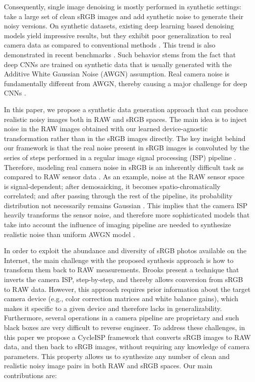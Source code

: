 \documentclass[10pt,twocolumn,letterpaper]{article}
\begin{document}
Consequently, single image denoising is mostly performed in synthetic settings: take a large set of clean sRGB images and add synthetic noise to generate their noisy versions. 
On synthetic datasets, existing deep learning based denoising models yield impressive results, but they exhibit poor generalization to real camera data as compared to conventional methods \cite{NLM,BM3D}. 
This trend is also demonstrated in recent benchmarks \cite{sidd,dnd}. Such behavior stems from the fact that deep CNNs are trained on synthetic data that is usually generated with the Additive White Gaussian Noise (AWGN) assumption. 
Real camera noise is fundamentally different from AWGN, thereby causing a major challenge for deep CNNs \cite{bertalmio2018denoising,foi2009noisemodel,foi2008noisemodel}. 

In this paper, we propose a synthetic data generation approach that can produce realistic noisy images both in RAW and sRGB spaces. 
The main idea is to inject noise in the RAW images obtained with our learned device-agnostic transformation rather than in the sRGB images directly. 
The key insight behind our framework is that the real noise present in sRGB images is convoluted by the series of steps performed in a regular image signal processing (ISP) 
pipeline \cite{bertalmio2018denoising, Ramanath2005}.
Therefore, modeling real camera noise in sRGB is an inherently difficult task as compared to RAW sensor data \cite{lebrun2012secrets}. As an example, noise at the RAW sensor space is signal-dependent; after demosaicking, it becomes spatio-chromatically correlated; and after passing through the rest of the pipeline, its probability distribution not necessarily remains Gaussian \cite{seybold2014noise}. 
This implies that the camera ISP heavily transforms the sensor noise, and therefore more sophisticated models that take into account the influence of imaging pipeline are needed to synthesize realistic noise than uniform AWGN model \cite{sidd,ghimpecteanu2016local,dnd}.



In order to exploit the abundance and diversity of sRGB photos available on the Internet, the main challenge with the proposed synthesis approach is how to transform them back to RAW measurements.
Brooks \etal \cite{Brooks2019} present a technique that inverts the camera ISP, step-by-step, and thereby allows conversion from sRGB to RAW data.
However, this approach 
requires prior information about the target camera device (e.g., color correction matrices and white balance gains), which makes it specific to a given device and therefore lacks in generalizability. 
Furthermore, several operations in a camera pipeline are proprietary and such black boxes are very difficult to reverse engineer. 
To address these challenges, in this paper we propose a CycleISP framework that converts sRGB images to RAW data, and then back to sRGB images, without requiring any knowledge of camera parameters. 
This property allows us to synthesize any number of clean and realistic noisy image pairs in both RAW and sRGB spaces. Our main contributions are: 
\end{document}
